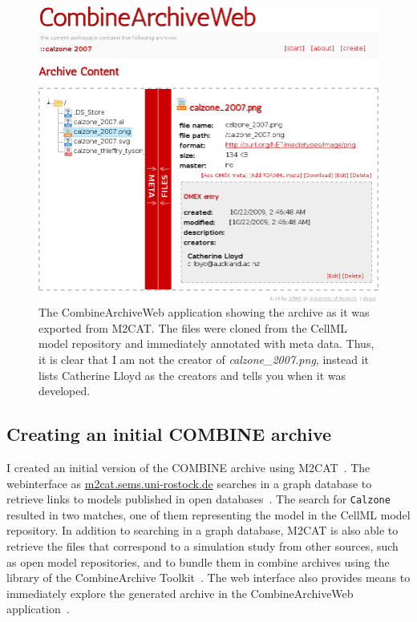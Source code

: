 \begin{figure}
\begin{center}
\includegraphics[width=.8\textwidth]{img/webcat-screenshot-combined.png}
\end{center}
\caption{The CombineArchiveWeb application showing the archive as it was exported from M2CAT. The files were cloned from the CellML model repository and immediately annotated with meta data. Thus, it is clear that I am not the creator of \textit{calzone\_2007.png}, instead it lists Catherine Lloyd as the creators and tells you when it was developed.}
\label{fig:screen:webcat}
\end{figure}

\subsection{Creating an initial COMBINE archive}

I created an initial version of the COMBINE archive using M2CAT~\cite{m2cat}.
The webinterface as \href{http://m2cat.sems.uni-rostock.de/}{m2cat.sems.uni-rostock.de} searches in a graph database to retrieve links to models published in open databases~\cite{masymos}.
The search for \texttt{Calzone} resulted in two matches, one of them representing the model in the CellML model repository.
In addition to searching in a graph database, M2CAT is also able to retrieve the files that correspond to a simulation study from other sources, such as open model repositories, and to bundle them in combine archives using the library of the CombineArchive Toolkit~\cite{cat}.
The web interface also provides means to immediately explore the generated archive in the CombineArchiveWeb application~\cite{scharm2014}.

